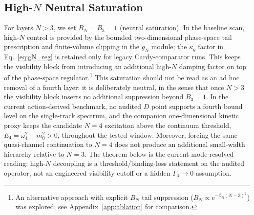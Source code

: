 \documentclass[aps,prd,onecolumn,notitlepage,nofootinbib,superscriptaddress,11pt,floatfix]{revtex4-2}
\newcommand{\ee}{\mathrm{e}}
\begin{document}
\subsection{High-\texorpdfstring{$N$}{N} Neutral Saturation}
For layers $N > 3$, we set $B_N = B_3 = 1$ (neutral saturation). In the baseline scan, high-$N$ control is provided by the bounded two-dimensional phase-space tail prescription and finite-volume clipping in the $g_N$ module; the $\kappa_g$ factor in Eq.~\eqref{eq:gN_reg} is retained only for legacy Cardy-comparator runs. This keeps the visibility block from introducing an additional high-$N$ damping factor on top of the phase-space regulator.\footnote{An alternative approach with explicit $B_N$ tail suppression ($B_N \propto \ee^{-\beta_B(N-3)^2}$) was explored; see Appendix~\ref{app:ablation} for comparison.}
This saturation should not be read as an ad hoc removal of a fourth layer: it is deliberately neutral, in the sense that once $N>3$ the visibility block inserts no additional suppression beyond $B_3=1$. In the current action-derived benchmark, no audited $D$ point supports a fourth bound level on the single-track spectrum, and the companion one-dimensional kinetic proxy keeps the candidate $N=4$ excitation above the continuum threshold, $E_4=\omega_4^2-m_0^2>0$, throughout the tested window. Moreover, forcing the same quasi-channel continuation to $N=4$ does not produce an additional small-width hierarchy relative to $N=3$. The theorem below is the current mode-resolved reading: high-$N$ decoupling is a threshold/binding-loss statement on the audited operator, not an engineered visibility cutoff or a hidden $\Gamma_4\to0$ assumption.
\end{document}
